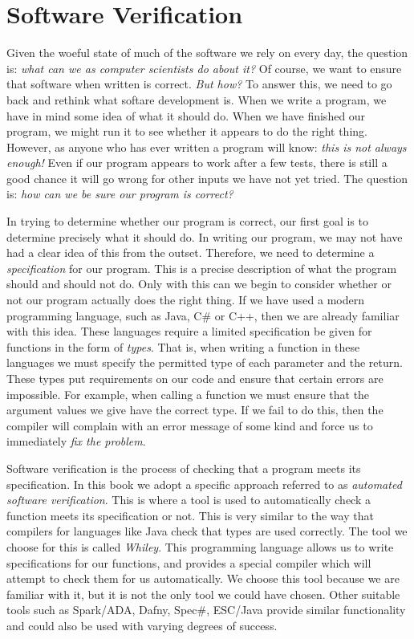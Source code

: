 \section{Software Verification}

Given the woeful state of much of the software we rely on every day, the question is: {\em what can we as computer scientists do about it?}  Of course, we want to ensure that software when written is correct.  {\em But how?}  To answer this, we need to go back and rethink what softare development is.  When we write a program, we have in mind some idea of what it should do.  When we have finished our program, we might run it to see whether it appears to do the right thing.  However, as anyone who has ever written a program will know: {\em this is not always enough!}  Even if our program appears to work after a few tests, there is still a good chance it will go wrong for other inputs we have not yet tried.  The question is: {\em how can we be sure our program is correct?}

In trying to determine whether our program is correct, our first goal is to determine precisely what it should do.  In writing our program, we may not have had a clear idea of this from the outset.  Therefore, we need to determine a {\em specification} for our program.  This is a precise description of what the program should and should not do.  Only with this can we begin to consider whether or not our program actually does the right thing.  If we have used a modern programming language,  such as Java, C\# or C++, then we are already familiar with this idea.  These languages require a limited specification be given for functions in the form of {\em types}.  That is, when writing a function in these languages we must specify the permitted type of each parameter and the return.  These types put requirements on our code and ensure that certain errors are impossible.  For example, when calling a function we must ensure that the argument values we give have the correct type.  If we fail to do this, then the compiler will complain with an error message of some kind and force us to immediately {\em fix the problem}.

Software verification is the process of checking that a program meets its specification.  In this book we adopt a specific approach referred to as {\em automated software verification}.  This is where a tool is used to automatically check a function meets its specification or not.  This is very similar to the way that compilers for languages like Java check that types are used correctly.  The tool we choose for this is called {\em Whiley}.  This programming language allows us to write specifications for our functions, and provides a special compiler which will attempt to check them for us automatically.  We choose this tool because we are familiar with it, but it is not the only tool we could have chosen.  Other suitable tools such as Spark/ADA, Dafny, Spec\#, ESC/Java provide similar functionality and could also be used with varying degrees of success.

